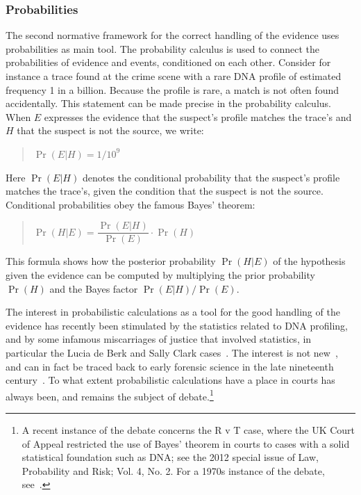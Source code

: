 \documentclass[10pt]{article}
\begin{document}
\subsubsection{Probabilities}
The second normative framework for the correct handling of the evidence uses probabilities as main tool. The probability calculus is used to connect the probabilities of evidence and events, conditioned on each other. Consider for instance a trace found at the crime scene with a rare DNA profile of estimated frequency 1 in a billion. Because the profile is rare, a match is not often found accidentally. This statement can be made precise in the probability calculus. When $E$ expresses the evidence that the suspect's profile matches the trace's and $H$ that the suspect is not the source, we write:

\begin{quotation}
	$\Pr(E|H) = 1/10^9$
\end{quotation}

\noindent Here $\Pr(E|H)$ denotes the conditional probability that the suspect's profile matches the trace's, given the condition that the suspect is not the source. Conditional probabilities obey the famous Bayes' theorem:

\begin{quotation}
	$\Pr(H|E) = \dfrac{\Pr(E|H)}{\Pr(E)}\cdot\Pr(H)$
\end{quotation}

\noindent This formula shows how the posterior probability $\Pr(H|E)$ of the hypothesis given the evidence can be computed by multiplying the prior probability $\Pr(H)$ and the Bayes factor $\Pr(E|H)/\Pr(E)$.

The interest in probabilistic calculations as a tool for the good handling of the evidence has recently been stimulated by the statistics related to DNA profiling, and by some infamous miscarriages of justice that involved statistics, in particular the Lucia de Berk and Sally Clark cases~\citep{dawidEtal2011,fenton2011,schnepsColmez2013}. The interest is not new~\citep{tillers2011}, and can in fact be traced back to early forensic science in the late nineteenth century~\citep{taroniEtal1998}. To what extent probabilistic calculations have a place in courts has always been, and remains the subject of debate.\footnote{A recent instance of the debate concerns the R v T case, where the UK Court of Appeal restricted the use of Bayes' theorem in courts to cases with a solid statistical foundation such as DNA; see the 2012 special issue of Law, Probability and Risk; Vol. 4, No. 2. For a 1970s instance of the debate, see~\citet{finkelsteinFairley1970,tribe1971}.}
\end{document}
